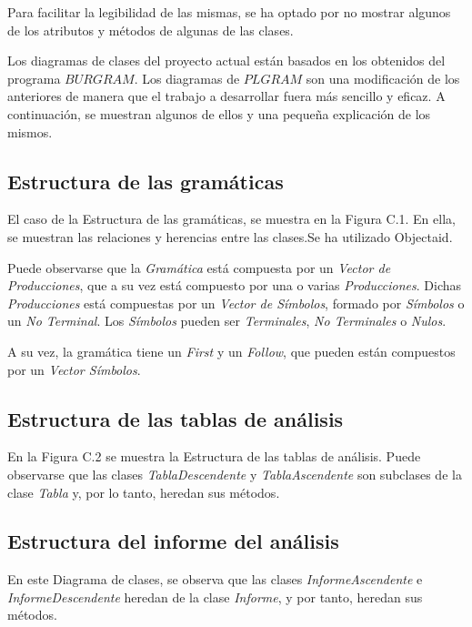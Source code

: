 Para facilitar la legibilidad de las mismas, se ha optado por no mostrar algunos de los atributos y métodos de algunas de las clases.

Los diagramas de clases del proyecto actual están basados en los obtenidos del programa $BURGRAM$. Los diagramas de $PLGRAM$ son una modificación de los anteriores de manera que el trabajo a desarrollar fuera más sencillo y eficaz. A continuación, se muestran algunos de ellos y una pequeña explicación de los mismos.
\newpage
\subsection{Estructura de las gramáticas}
El caso de la Estructura de las gramáticas, se muestra en la Figura C.1. En ella, se muestran las relaciones y herencias entre las clases.Se ha utilizado Objectaid\cite{objectaid}.

Puede observarse que la \textit{Gramática} está compuesta por un \textit{Vector de Producciones}, que a su vez está compuesto por una o varias \textit{Producciones}. Dichas \textit{Producciones} está compuestas por un \textit{Vector de Símbolos}, formado por \textit{Símbolos} o un \textit{No Terminal}. Los \textit{Símbolos} pueden ser \textit{Terminales}, \textit{No Terminales} o \textit{Nulos}.

A su vez, la gramática tiene un \textit{First} y un \textit{Follow}, que pueden están compuestos por un \textit{Vector Símbolos}.

\newpage
\subsection{Estructura de las tablas de análisis}

En la Figura C.2 se muestra la Estructura de las tablas de análisis. Puede observarse que las clases \textit{TablaDescendente} y \textit{TablaAscendente} son subclases de la clase \textit{Tabla} y, por lo tanto, heredan sus métodos.
\vspace{0.5cm}
\newpage
\subsection{Estructura del informe del análisis}

En este Diagrama de clases, se observa que las clases \textit{InformeAscendente} e \textit{InformeDescendente} heredan de la clase \textit{Informe}, y por tanto, heredan sus métodos.

